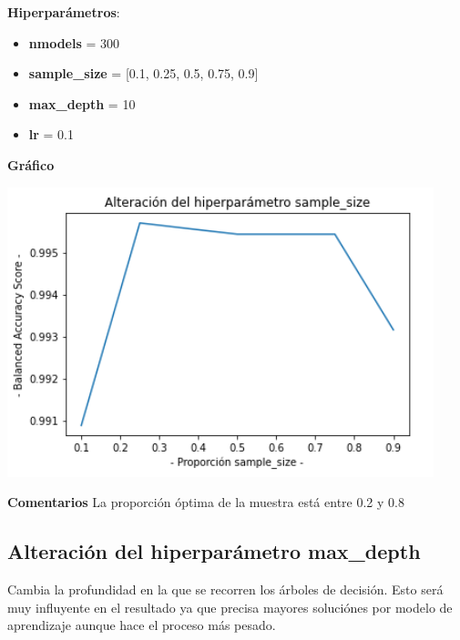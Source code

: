 \documentclass[conference,a4paper]{IEEEtran}
\begin{document}
\begin{textb}
    \textbf{Hiperparámetros}:
  \begin{itemize}
      \item \textbf{nmodels} = 300
      \item \textbf{sample\_size} = [0.1, 0.25, 0.5, 0.75, 0.9]
      \item \textbf{max\_depth} = 10
      \item \textbf{lr} = 0.1
  \end{itemize}
  \textbf{Gráfico}
  
  \begin{center}
    \includegraphics[scale=0.80]{figures/samplesize_BreastCancerDataset_trees.png}
    \label{fig:funcion_clasificacion}
  \end{center}
  
  \textbf{Comentarios} La proporción óptima de la muestra está entre 0.2 y 0.8
\end{textb}

\subsection{Alteración del hiperparámetro max\_depth}
Cambia la profundidad en la que se recorren los árboles de decisión. Esto será muy influyente en el resultado ya que precisa mayores soluciónes por modelo de aprendizaje aunque hace el proceso más pesado.
\end{document}
